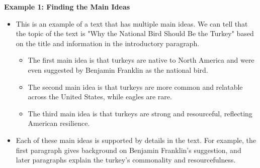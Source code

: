 \documentclass[12pt]{article}
\begin{document}
\begin{tcolorbox}[colframe=black!60, colback=white, 
coltitle=black, colbacktitle=black!15, fonttitle=\bfseries\Large, 
title=Examples, halign title=center, left=10pt, right=10pt, top=10pt, bottom=15pt]

\textbf{Example 1: Finding the Main Ideas}
\begin{itemize}
    \item This is an example of a text that has multiple main ideas. We can tell that the topic of the text is "Why the National Bird Should Be the Turkey" based on the title and information in the introductory paragraph. 
    \begin{itemize}
        \item The first main idea is that turkeys are native to North America and were even suggested by Benjamin Franklin as the national bird.
        \item The second main idea is that turkeys are more common and relatable across the United States, while eagles are rare.
        \item The third main idea is that turkeys are strong and resourceful, reflecting American resilience.
    \end{itemize}
    \item Each of these main ideas is supported by details in the text. For example, the first paragraph gives background on Benjamin Franklin's suggestion, and later paragraphs explain the turkey's commonality and resourcefulness.
\end{itemize}

\end{tcolorbox}


\vspace{1em}
\end{document}
